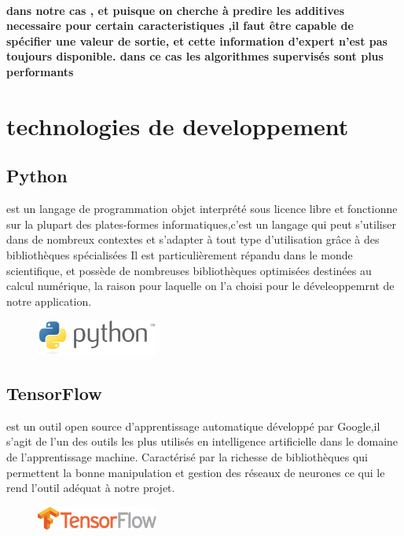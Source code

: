 \documentclass[11pt]{report}
\begin{document}
\paragraph{dans notre cas , et puisque on cherche à predire les additives necessaire pour certain caracteristiques ,il faut être capable de spécifier une valeur de sortie, et cette information d’expert n’est pas
	toujours disponible. dans ce cas les algorithmes supervisés sont plus performants}


\section{technologies de developpement }
\subsection{Python}
 est un langage de programmation objet interprété sous licence libre et fonctionne sur la plupart des plates-formes informatiques,c'est un langage qui peut s'utiliser dans de nombreux contextes et s'adapter à tout type d'utilisation grâce à des bibliothèques spécialisées Il est particulièrement répandu dans le monde scientifique, et possède de nombreuses bibliothèques optimisées destinées au calcul numérique, la raison pour laquelle on l'a choisi pour le déveleoppemrnt de notre application.
 \begin{figure}[H]
 	\begin{center}
 		\includegraphics[width=4cm]{images/python.png}
 		\label{fig:figure}
 	\end{center}
 \end{figure}
 
 \subsection{TensorFlow}
 est un outil open source d'apprentissage automatique développé par Google,il s'agit de l'un des outils les plus utilisés en intelligence artificielle dans le domaine de l'apprentissage machine. Caractérisé par la richesse de bibliothèques qui permettent la bonne manipulation et gestion des réseaux de neurones ce qui le rend l'outil adéquat à notre projet.
  \begin{figure}[H]
 	\begin{center}
 		\includegraphics[width=4cm]{images/tensor.png}
 		\label{fig:figure}
 	\end{center}
 \end{figure}
 
\end{document}
